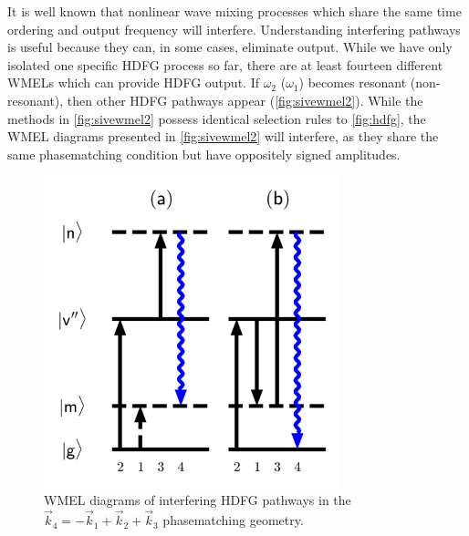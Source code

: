 \documentclass[aip, jcp, reprint, twocolumn]{revtex4-2}
\begin{document}
It is well known that nonlinear wave mixing processes which share the same time ordering and output frequency will interfere. \cite{RN135, Bonn2024}
Understanding interfering pathways is useful because they can, in some cases, eliminate output. \cite{RN342, RN135}
While we have only isolated one specific HDFG process so far, there are at least fourteen different WMELs which can provide HDFG output. \cite{RN352}
If $\omega_2$ ($\omega_1$) becomes resonant (non-resonant), then other HDFG pathways appear (\autoref{fig:sivewmel2}).\cite{McDonnell2024} 
While the methods in \autoref{fig:sivewmel2} possess identical selection rules to \autoref{fig:hdfg}, the WMEL diagrams presented in \autoref{fig:sivewmel2} will interfere, as they share the same phasematching condition but have oppositely signed amplitudes.
\begin{figure}[!htbp]
	\centering
	\includegraphics[width=3.375in]{figures/timeorderedwmel.png}
	\caption{WMEL diagrams of interfering HDFG pathways in the  $\vec{k}_4 = -\vec{k}_1 + \vec{k}_2 + \vec{k}_3$ phasematching geometry. 
		}
	\label{fig:sivewmel2}
\end{figure}
\end{document}

